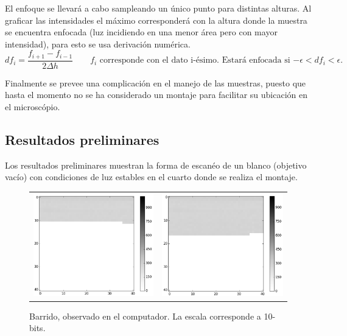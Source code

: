 \documentclass[11pt]{article}
\begin{document}
		El enfoque se llevará a cabo sampleando un único punto para distintas alturas. Al graficar las intensidades el máximo corresponderá con la altura donde la muestra se encuentra enfocada (luz incidiendo en una menor área pero con mayor intensidad), para esto se usa derivación numérica.
		\begin{equation}
			df_i = \dfrac{f_{i+1} - f_{i-1}}{2\Delta h} \qquad \text{$f_i$ corresponde con el dato i-ésimo. Estará enfocada si $-\epsilon < df_i < \epsilon$.}
		\end{equation}
		
		Finalmente se prevee una complicación en el manejo de las muestras, puesto que hasta el momento no se ha considerado un montaje para facilitar su ubicación en el microscópio.
		
	\subsection{Resultados preliminares}
	Los resultados preliminares muestran la forma de escanéo de un blanco (objetivo vacío) con condiciones de luz estables en el cuarto donde se realiza el montaje.
	\begin{figure}[h]
		\centering
		\begin{tabular}{cc}
			\includegraphics[width=0.3\linewidth]{data1.png} &
			\includegraphics[width=0.3\linewidth]{data2.png}
		\end{tabular}
		\caption{Barrido, observado en el computador. La escala corresponde a 10-bits.}
	\end{figure}
\end{document}
